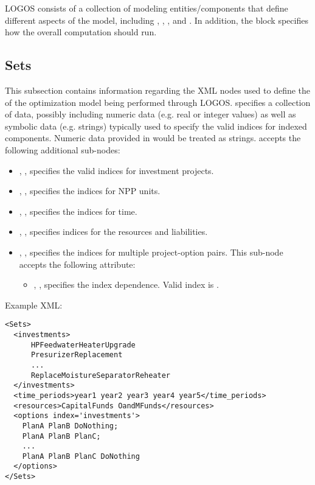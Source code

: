 LOGOS consists of a collection of modeling entities/components that define different
aspects of the model, including , ,
, and . In addition, the 
block specifies how the overall computation should run.

%
\subsection{Sets}
\label{subsec:Sets}

This subsection contains information regarding the XML nodes used to define the
 of the optimization model being performed through LOGOS.
 specifies a collection of data, possibly including
numeric data (e.g. real or integer values) as well as symbolic data (e.g. strings)
typically used to specify the valid indices for indexed components.
\nb Numeric data provided in  would be treated as strings.
 accepts the following additional sub-nodes:
\begin{itemize}
  \item {}, , specifies
  the valid indices for investment projects.
  \item {}, ,
  specifies the indices for NPP units.
  \item {}, ,
  specifies the indices for time.
  \item {}, ,
  specifies indices for the resources and liabilities.
  \item {}, ,
  specifies the indices for multiple project-option pairs.
  This sub-node accepts the following attribute:
  \begin{itemize}
    \item {}, , specifies the index dependence.
    Valid index is .
  \end{itemize}
\end{itemize}

Example XML:
\begin{lstlisting}[style=XML]
<Sets>
  <investments>
      HPFeedwaterHeaterUpgrade
      PresurizerReplacement
      ...
      ReplaceMoistureSeparatorReheater
  </investments>
  <time_periods>year1 year2 year3 year4 year5</time_periods>
  <resources>CapitalFunds OandMFunds</resources>
  <options index='investments'>
    PlanA PlanB DoNothing;
    PlanA PlanB PlanC;
    ...
    PlanA PlanB PlanC DoNothing
  </options>
</Sets>
\end{lstlisting}


